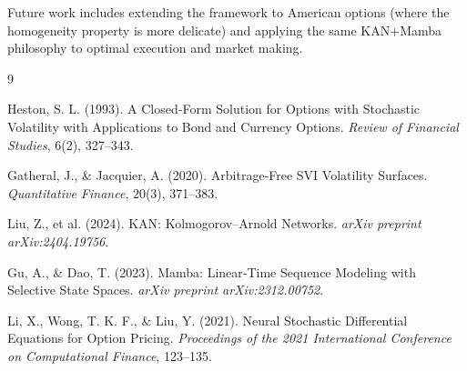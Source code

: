 \documentclass[12pt,a4paper]{article}
\begin{document}
Future work includes extending the framework to American options (where the homogeneity property is more delicate) and applying the same KAN+Mamba philosophy to optimal execution and market making.


\begin{thebibliography}{9}

Heston, S. L. (1993). A Closed‑Form Solution for Options with Stochastic Volatility with Applications to Bond and Currency Options. \textit{Review of Financial Studies}, 6(2), 327–343.

Gatheral, J., \& Jacquier, A. (2020). Arbitrage‑Free SVI Volatility Surfaces. \textit{Quantitative Finance}, 20(3), 371–383.

Liu, Z., et al. (2024). KAN: Kolmogorov–Arnold Networks. \textit{arXiv preprint arXiv:2404.19756}.

Gu, A., \& Dao, T. (2023). Mamba: Linear‑Time Sequence Modeling with Selective State Spaces. \textit{arXiv preprint arXiv:2312.00752}.

Li, X., Wong, T. K. F., \& Liu, Y. (2021). Neural Stochastic Differential Equations for Option Pricing. \textit{Proceedings of the 2021 International Conference on Computational Finance}, 123–135.

\end{thebibliography}
\end{document}
